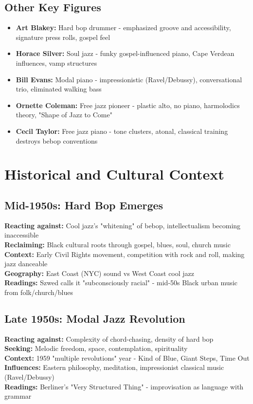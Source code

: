 \documentclass[11pt]{article}
\begin{document}
\subsection*{Other Key Figures}
\begin{itemize}[leftmargin=*, itemsep=0.2em]
\item \textbf{Art Blakey:} Hard bop drummer - emphasized groove and accessibility, signature press rolls, gospel feel
\item \textbf{Horace Silver:} Soul jazz - funky gospel-influenced piano, Cape Verdean influences, vamp structures
\item \textbf{Bill Evans:} Modal piano - impressionistic (Ravel/Debussy), conversational trio, eliminated walking bass
\item \textbf{Ornette Coleman:} Free jazz pioneer - plastic alto, no piano, harmolodics theory, "Shape of Jazz to Come"
\item \textbf{Cecil Taylor:} Free jazz piano - tone clusters, atonal, classical training destroys bebop conventions
\end{itemize}

\section*{Historical and Cultural Context}

\subsection*{Mid-1950s: Hard Bop Emerges}
\textbf{Reacting against:} Cool jazz's "whitening" of bebop, intellectualism becoming inaccessible \\
\textbf{Reclaiming:} Black cultural roots through gospel, blues, soul, church music \\
\textbf{Context:} Early Civil Rights movement, competition with rock and roll, making jazz danceable \\
\textbf{Geography:} East Coast (NYC) sound vs West Coast cool jazz \\
\textbf{Readings:} Szwed calls it "subconsciously racial" - mid-50s Black urban music from folk/church/blues

\subsection*{Late 1950s: Modal Jazz Revolution}
\textbf{Reacting against:} Complexity of chord-chasing, density of hard bop \\
\textbf{Seeking:} Melodic freedom, space, contemplation, spirituality \\
\textbf{Context:} 1959 "multiple revolutions" year - Kind of Blue, Giant Steps, Time Out \\
\textbf{Influences:} Eastern philosophy, meditation, impressionist classical music (Ravel/Debussy) \\
\textbf{Readings:} Berliner's "Very Structured Thing" - improvisation as language with grammar
\end{document}

